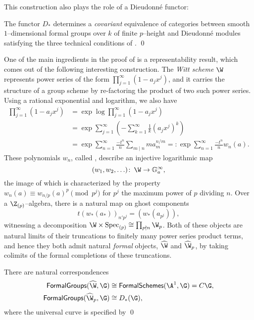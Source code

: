 This construction also plays the role of a Dieudonn\'e functor:

\begin{theorem}\label{CurveDieudonneTheorem}
The functor $D_*$ determines a \emph{covariant} equivalence of categories between smooth $1$--dimensional formal groups over $k$ of finite $p$--height and Dieudonn\'e modules satisfying the three technical conditions of . \qed
\end{theorem}

One of the main ingredients in the proof of  is a representability result, which comes out of the following interesting construction.  The \textit{Witt scheme} $\W$ represents power series of the form $\prod_{j=1}^\infty (1 - a_j x^j)$, and it carries the structure of a group scheme by re-factoring the product of two such power series.  Using a rational exponential and logarithm, we also have
\begin{align*}
\prod_{j=1}^\infty (1 - a_j x^j) & = \exp \log \prod_{j=1}^\infty (1 - a_j x^j) \\
& = \exp \sum_{j=1}^\infty \left(-\sum_{k=1}^\infty \frac{1}{k} (a_j x^j)^k\right) \\
& = \exp \sum_{n=1}^\infty \frac{-t^n}{n} \sum_{m \mid n} m a_m^{n/m} =: \exp \sum_{n=1}^\infty \frac{-t^n}{n} w_n(a).
\end{align*}
These polynomials $w_n$, called , describe an injective logarithmic map \[(w_1, w_2, \ldots) \co \W \to \Ga^\infty,\] the image of which is characterized by the property $w_n(a) \equiv w_{n/p}(a)^p \pmod{p^j}$ for $p^j$ the maximum power of $p$ dividing $n$.  Over a $\Z_{(p)}$--algebra, there is a natural map on ghost components \[t(w_*(a_*))_{n'p^j} = (w_*(a_{p^j})),\] witnessing a decomposition $\W \times \Spec_{(p)} \cong \prod_{p \nmid n} \W_p$.  Both of these objects are natural limits of their truncations to finitely many power series product terms, and hence they both admit natural \emph{formal} objects, $\widehat{\W}$ and $\widehat{\W}_p$, by taking colimits of the formal completions of these truncations.

\begin{lemma}
There are natural correspondences
\begin{align*}
\CatOf{FormalGroups}(\widehat{\W}, \G) & \cong \CatOf{FormalSchemes}(\A^1, \G) = C\G, \\
\CatOf{FormalGroups}(\widehat{\W}_p, \G) & \cong D_*(\G),
\end{align*}
where the universal curve is specified by  \qed
\end{lemma}

